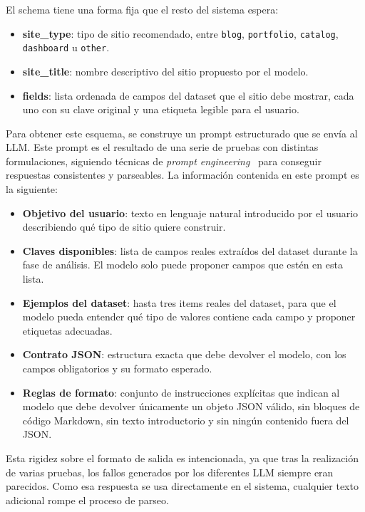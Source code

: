 El schema tiene una forma fija que el resto del sistema espera:
\begin{itemize}
    \item \textbf{site\_type}: tipo de sitio recomendado, entre \texttt{blog}, \texttt{portfolio}, \texttt{catalog}, \texttt{dashboard} u \texttt{other}.
    \item \textbf{site\_title}: nombre descriptivo del sitio propuesto por el modelo.
    \item \textbf{fields}: lista ordenada de campos del dataset que el sitio debe mostrar, cada uno con su clave original y una etiqueta legible para el usuario.
\end{itemize}

Para obtener este esquema, se construye un prompt estructurado que se envía al LLM. Este prompt es el resultado de una serie de pruebas con distintas formulaciones,  
siguiendo técnicas de \emph{prompt engineering}~\cite{openai_prompt_engineering} para conseguir respuestas consistentes y parseables. La información contenida en este 
prompt es la siguiente:

\begin{itemize}
    \item \textbf{Objetivo del usuario}: texto en lenguaje natural introducido por 
    el usuario describiendo qué tipo de sitio quiere construir.
    
    \item \textbf{Claves disponibles}: lista de campos reales extraídos del dataset 
    durante la fase de análisis. El modelo solo puede proponer campos que estén 
    en esta lista.
    
    \item \textbf{Ejemplos del dataset}: hasta tres items reales del dataset, para 
    que el modelo pueda entender qué tipo de valores contiene cada campo y proponer 
    etiquetas adecuadas.
    
    \item \textbf{Contrato JSON}: estructura exacta que debe devolver el modelo, 
    con los campos obligatorios y su formato esperado.
    
    \item \textbf{Reglas de formato}: conjunto de instrucciones explícitas que 
    indican al modelo que debe devolver únicamente un objeto JSON válido, sin 
    bloques de código Markdown, sin texto introductorio y sin ningún contenido 
    fuera del JSON.
\end{itemize}

Esta rigidez sobre el formato de salida es intencionada, ya que tras la 
realización de varias pruebas, los fallos generados por los diferentes LLM 
siempre eran parecidos. Como esa respuesta se usa directamente en el sistema, 
cualquier texto adicional rompe el proceso de parseo.


